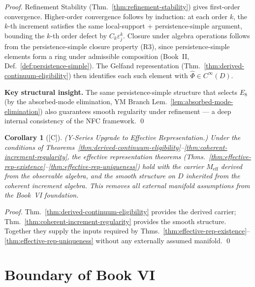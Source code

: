 \documentclass[12pt,oneside]{amsbook}
\theoremstyle{plain}
\newtheorem{corollary}[theorem]{Corollary}
\theoremstyle{definition}
\theoremstyle{remark}
\newcommand{\status}[1]{\textup{[#1]}}
\begin{document}
\begin{proof}
Refinement Stability (Thm.~\ref{thm:refinement-stability}) gives
first-order convergence.  Higher-order convergence follows by
induction: at each order $k$, the $k$-th increment satisfies the
same local-support + persistence-simple argument, bounding the
$k$-th order defect by $C_k \varepsilon_j^k$.  Closure under algebra
operations follows from the persistence-simple closure property (R3),
since persistence-simple elements form a ring under admissible
composition (Book~II, Def.~\ref{def:persistence-simple}).  The
Gelfand representation (Thm.~\ref{thm:derived-continuum-eligibility})
then identifies each such element with $\hat{\Phi} \in C^\infty(D)$.

\textbf{Key structural insight.}  The same persistence-simple
structure that selects $E_8$ (by the absorbed-mode elimination,
YM Branch Lem.~\ref{lem:absorbed-mode-elimination}) also guarantees
smooth regularity under refinement --- a deep internal consistency
of the NFC framework. \qed
\end{proof}

\begin{corollary}[\status{C}]\label{cor:y-series-upgrade}
\textup{(Y-Series Upgrade to Effective Representation.)}
Under the conditions of
Theorems~\ref{thm:derived-continuum-eligibility}--\ref{thm:coherent-increment-regularity},
the effective representation theorems
(Thms.~\ref{thm:effective-rep-existence}--\ref{thm:effective-rep-uniqueness})
hold with the carrier $M_{\mathrm{eff}}$ derived from the observable
algebra, and the smooth structure on $D$ inherited from the coherent
increment algebra.  This removes all external manifold assumptions
from the Book~VI foundation.
\end{corollary}

\begin{proof}
Thm.~\ref{thm:derived-continuum-eligibility} provides the derived
carrier; Thm.~\ref{thm:coherent-increment-regularity} provides the
smooth structure.  Together they supply the inputs required by
Thms.~\ref{thm:effective-rep-existence}--\ref{thm:effective-rep-uniqueness}
without any externally assumed manifold. \qed
\end{proof}

\section{Boundary of Book VI}
\end{document}
